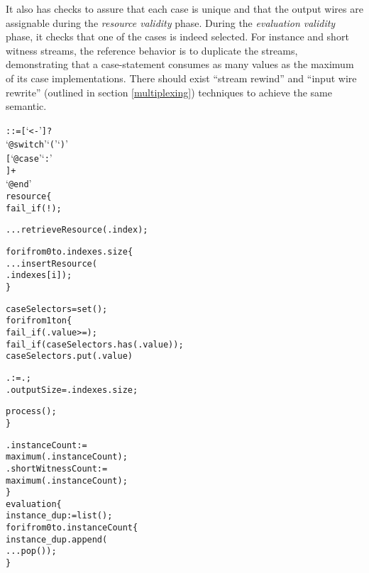 It also has checks to assure that each case is unique and that the output wires are assignable during the \textit{resource validity} phase.
During the \textit{evaluation validity} phase, it checks that one of the cases is indeed selected.
For instance and short witness streams, the reference behavior is to duplicate the streams, demonstrating that a case-statement consumes as many values as the maximum of its case implementations.
There should exist ``stream rewind'' and ``input wire rewrite'' (outlined in section \ref{multiplexing}) techniques to achieve the same semantic.\\

\begin{alltt}\ttSyn
   ::= [  `<-' ]?
                          `@switch' `('  `)'
                          [ `@case'  `:'
                          ]+
                          `@end'\ttSem
  resource \{
    fail_if(!);

    ...retrieveResource(.index);

    for i from 0 to .indexes.size \{
      ...insertResource(
        .indexes[i]);
    \}

    caseSelectors = set();
    for i from 1 to n \{
      fail_if(.value >= );
      fail_if(caseSelectors.has(.value));
      caseSelectors.put(.value)

      . := .;
      .outputSize = .indexes.size;
      
      process();
    \}
    
    .instanceCount :=
      maximum(.instanceCount);
    .shortWitnessCount :=
      maximum(.instanceCount);
  \}
  evaluation \{
    instance_dup := list();
    for i from 0 to .instanceCount \{
      instance_dup.append(
        ...pop());
    \}


\end{alltt}
